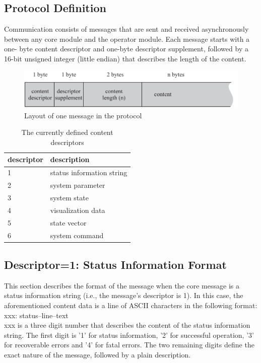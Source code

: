 \documentclass[letterpaper,oneside,12pt]{book}
\begin{document}
\subsection{Protocol Definition}
\label{protocol_definition}

Communication consists of messages that are sent and received asynchronously 
between any core module and the operator module. Each message starts with a one-
byte content descriptor and one-byte descriptor supplement, followed by a 16-bit 
unsigned integer (little endian) that describes the length of the content.

\begin{figure}[ht]
 \centerline{\includegraphics{figures/operator_prot}}
 \caption{Layout of one message in the protocol}
\end{figure}

\begin{table}[ht]
 \centering
 \begin{tabular}{|l|l|}
  \hline
  \textbf{descriptor} & \textbf{description} \\
  \hline
  1 & status information string \\
  \hline
  2 & system parameter \\
  \hline
  3 & system state \\
  \hline
  4 & visualization data \\
  \hline
  5 & state vector \\
  \hline
  6 & system command \\
  \hline
 \end{tabular}
 \caption{The currently defined content descriptors}
\end{table}   


\subsection{Descriptor=1: Status Information Format}
\label{statusinfo_format}

This section describes the format of the message when the core message is 
a status information string (i.e., the message's descriptor is 1). In this 
case, the aforementioned content data is a line of ASCII characters 
in the following format:
\\[2ex]
xxx: status--line--text 
\\[2ex]
xxx is a three digit number that describes the content of the status information string. 
The first digit is '1' for status information, '2' for successful operation, '3' 
for recoverable errors and '4' for fatal errors. The two remaining digits define 
the exact nature of the message, followed by a plain description.
\end{document}

